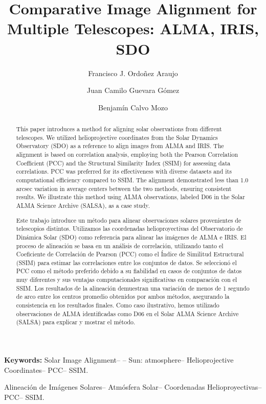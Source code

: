 \documentclass[a4paper,alpha-refs]{eSpectra}
\title{Comparative Image Alignment for Multiple Telescopes: ALMA, IRIS, SDO}
\author[1,\authfn{1},]{Francisco J. Ordoñez Araujo}
\author[2,3,\authfn{2}]{Juan Camilo Guevara Gómez}
\author[1,\authfn{3}]{Benjamín Calvo Mozo}
\affil[1]{Observatorio Astronómico Nacional, Universidad Nacional de Colombia, Bogotá D.C., Colombia}
\affil[2]{Group Research \& Development DNV AS, Høvik, Norway}
\affil[3]{Rosseland Centre for Solar Physics, University of Oslo, Postboks 1029 Blindern, 0315 Oslo, Norway}
\begin{document}
\begin{frontmatter}
\maketitle

\begin{abstract}
\justifying
This paper introduces a method for aligning solar observations from different telescopes. We utilized helioprojective coordinates from the Solar Dynamics Observatory (SDO) as a reference to align images from ALMA and IRIS. The alignment is based on correlation analysis, employing both the Pearson Correlation Coefficient (PCC) and the Structural Similarity Index (SSIM) for assessing data correlations. PCC was preferred for its effectiveness with diverse datasets and its computational efficiency compared to SSIM. The alignment demonstrated less than 1.0\,arcsec variation in average centers between the two methods, ensuring consistent results. We illustrate this method using ALMA observations, labeled D06 in the Solar ALMA Science Archive (SALSA), as a case study.
\end{abstract}

\qquad\quad\textbf{Keywords:} Solar Image Alignment-- – Sun: atmosphere-- Helioprojective Coordinates-- PCC-- SSIM.

\begin{abstract}
\justifying
Este trabajo introduce un método para alinear observaciones solares provenientes de telescopios distintos. Utilizamos las coordenadas helioproyectivas del Observatorio de Dinámica Solar (SDO) como referencia para alinear las imágenes de ALMA e IRIS. El proceso de alineación se basa en un análisis de correlación, utilizando tanto el Coeficiente de Correlación de Pearson (PCC) como el Índice de Similitud Estructural (SSIM) para estimar las correlaciones entre los conjuntos de datos. Se seleccionó el PCC como el método preferido debido a su fiabilidad en casos de conjuntos de datos muy diferentes y sus ventajas computacionales significativas en comparación con el SSIM. Los resultados de la alineación demuestran una variación de menos de 1 segundo de arco entre los centros promedio obtenidos por ambos métodos, asegurando la consistencia en los resultados finales. Como caso ilustrativo, hemos utilizado observaciones de ALMA identificadas como D06 en el Solar ALMA Science Archive (SALSA) para explicar y mostrar el método.
\end{abstract}

\begin{skeywords}
Alineación de Imágenes Solares--  Atmósfera Solar-- Coordenadas Helioproyectivas-- PCC-- SSIM.
\end{skeywords}
\end{frontmatter}
\end{document}
